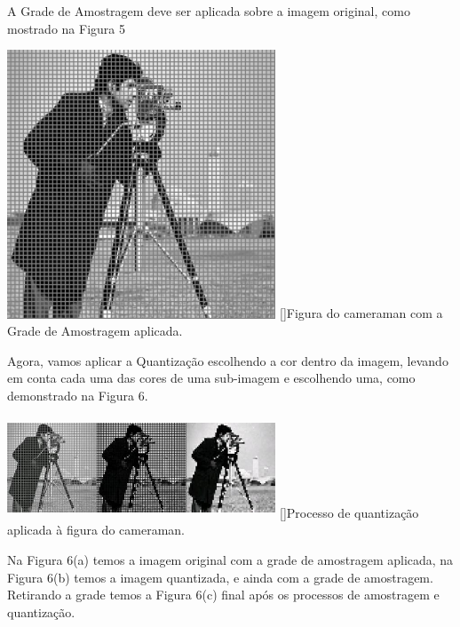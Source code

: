 \documentclass[a4paper,11pt]{article}
\newenvironment{Figure}
  {\par\medskip\noindent\minipage{\linewidth}}
    {\endminipage\par\medskip}
\begin{document}
\begin{multicols}{2}
A Grade de Amostragem deve ser aplicada sobre a imagem original, como mostrado na Figura 5
\begin{Figure}
	\centering 
	\includegraphics[width=8cm, height=8cm]{figura5}
	[]{Figura do cameraman com a Grade de Amostragem aplicada.}
	\label{medium}
\end{Figure}

Agora, vamos aplicar a Quantização escolhendo a cor dentro da imagem, levando em conta cada uma das cores de uma sub-imagem e escolhendo uma, como demonstrado na Figura 6.

\begin{Figure}
	\centering 
	\includegraphics[width=8cm, height=3cm]{Figura6}
	[]{Processo de quantização aplicada à figura do cameraman.}
	\label{medium}
\end{Figure}
Na Figura 6(a) temos a imagem original com a grade de amostragem aplicada, na Figura 6(b) temos a imagem quantizada, e ainda com a grade de amostragem. Retirando a grade temos a Figura 6(c) final após os processos de amostragem e quantização.

\end{multicols}
\end{document}
